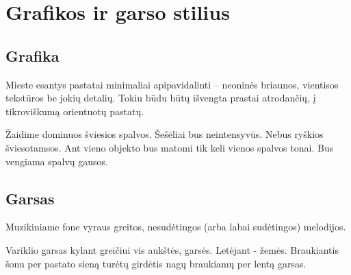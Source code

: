 \section{Grafikos ir garso stilius}
\subsection{Grafika}

Mieste esantys pastatai minimaliai apipavidalinti -- neoninės briaunos, vientisos tekstūros be jokių detalių.
Tokiu būdu būtų išvengta prastai atrodančių, į tikroviškumą orientuotų pastatų.

Žaidime dominuos šviesios spalvos.
Šešėliai bus neintensyvūs.
Nebus ryškios šviesotamsos.
Ant vieno objekto bus matomi tik keli vienos spalvos tonai.
Bus vengiama spalvų gausos.

\subsection{Garsas}
Muzikiniame fone vyraus greitos, nesudėtingos (arba labai sudėtingos) melodijos.

Variklio garsas kylant greičiui vis aukštės, garsės. Letėjant - žemės.
Braukiantis šonu per pastato sieną turėtų girdėtis nagų braukiamų per lentą garsas.
